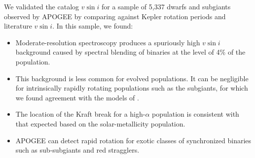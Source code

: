 \documentclass[preprint2]{aastex62}
\newcommand{\vsini}{\ensuremath{v \sin i}}
\begin{document}
We validated the catalog \vsini{} for a sample of 5,337 dwarfs and subgiants
observed by APOGEE by comparing against
Kepler rotation periods and literature \vsini{}. In this sample, we found: 

\begin{itemize}
    \item Moderate-resolution spectroscopy produces a spuriously high
        \vsini{} background caused by spectral blending of binaries at the
        level of 4\% of the population.
    \item This background is less common for evolved populations. It can be
        negligible for intrinsically rapidly rotating populations such as the
        subgiants, for which we found agreement with the models of
        \citet{vanSaders13}.
    \item The location of the Kraft break for a high-\(\alpha\) population is
        consistent with that expected based on the solar-metallicity
        population.
    \item APOGEE can detect rapid rotation for exotic classes of synchronized
        binaries such as sub-subgiants and red stragglers.
\end{itemize}
\end{document}
